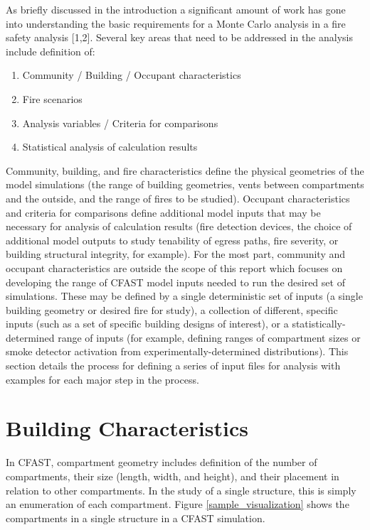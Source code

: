 \documentclass[12pt,twoside]{book}
\begin{document}
As briefly discussed in the introduction a significant amount of work has gone into understanding the basic requirements for a Monte Carlo analysis in a fire safety analysis [1,2]. Several key areas that need to be addressed in the analysis include definition of:

\begin{enumerate}
  \item Community / Building / Occupant characteristics
  \item Fire scenarios
  \item Analysis variables / Criteria for comparisons
  \item Statistical analysis of calculation results
\end{enumerate}

Community, building, and fire characteristics define the physical geometries of the model simulations (the range of building geometries, vents between compartments and the outside, and the range of fires to be studied). Occupant characteristics and criteria for comparisons define additional model inputs that may be necessary for analysis of calculation results (fire detection devices, the choice of additional model outputs to study tenability of egress paths, fire severity, or building structural integrity, for example). For the most part, community and occupant characteristics are outside the scope of this report which focuses on developing the range of CFAST model inputs needed to run the desired set of simulations. These may be defined by a single deterministic set of inputs (a single building geometry or desired fire for study), a collection of different, specific inputs (such as a set of specific building designs of interest), or a statistically-determined range of inputs (for example, defining ranges of compartment sizes or smoke detector activation from experimentally-determined distributions). This section details the process for defining a series of input files for analysis with examples for each major step in the process.

\section{Building Characteristics}

In CFAST, compartment geometry includes definition of the number of compartments, their size (length, width, and height), and their placement in relation to other compartments. In the study of a single structure, this is simply an enumeration of each compartment. Figure \ref{sample_visualization} shows the compartments in a single structure in a CFAST simulation.
\end{document}
